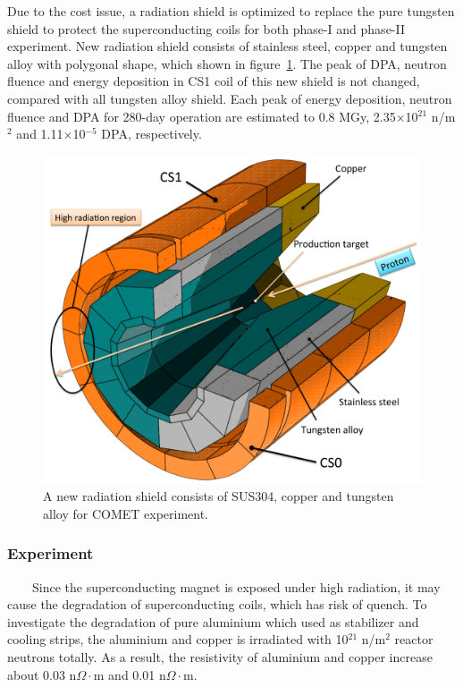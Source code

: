 \documentclass[a4paper, 10pt, twocolumn]{article}
\begin{document}
Due to the cost issue, a radiation shield is optimized to replace the pure tungsten shield to protect the superconducting coils for both phase-I and phase-II experiment.
New radiation shield consists of stainless steel, copper and tungsten alloy with polygonal shape, which shown in figure~\ref{shield}.
The peak of DPA, neutron fluence and energy deposition in CS1 coil of this new shield is not changed, compared with all tungsten alloy shield.
Each peak of energy deposition, neutron fluence and DPA for 280-day operation are estimated to 0.8 MGy, 2.35$\times$10$^{21}$ n/m$^2$ and 1.11$\times$10$^{-5}$ DPA, respectively.
\begin{figure}[H]
 \centering
 \includegraphics[scale=0.2]{fig/shielding.pdf}
 \caption{A new radiation shield consists of SUS304, copper and tungsten alloy for COMET experiment.}
 \label{shield}
\end{figure}

\subsubsection*{Experiment}
~~~~Since the superconducting magnet is exposed under high radiation, it may cause the degradation of superconducting coils, which has risk of quench.
To investigate the degradation of pure aluminium which used as stabilizer and cooling strips, the aluminium and copper is irradiated with 10$^{21}$ n/m$^2$ reactor neutrons totally.
As a result, the resistivity of aluminium and copper increase about 0.03 n$\Omega\cdot$m and 0.01 n$\Omega\cdot$m.
\end{document}
